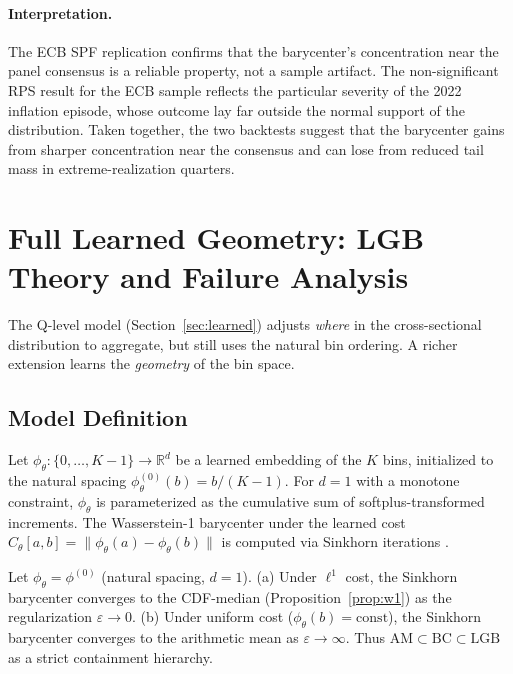 \paragraph{Interpretation.}  The ECB SPF replication confirms that the barycenter's
concentration near the panel consensus is a reliable property, not a sample artifact.
The non-significant RPS result for the ECB sample reflects the particular severity of the 2022
inflation episode, whose outcome lay far outside the normal support of the distribution.
Taken together, the two backtests suggest that the barycenter gains from sharper concentration
near the consensus and can lose from reduced tail mass in extreme-realization quarters.


\section{Full Learned Geometry: LGB Theory and Failure Analysis}
\label{app:lgb}

The Q-level model (Section~\ref{sec:learned}) adjusts \emph{where} in the cross-sectional
distribution to aggregate, but still uses the natural bin ordering.  A richer extension
learns the \emph{geometry} of the bin space.

\subsection*{Model Definition}

Let $\phi_\theta : \{0,\ldots,K-1\} \to \mathbb{R}^d$ be a learned embedding of the $K$ bins,
initialized to the natural spacing $\phi_\theta^{(0)}(b) = b/(K-1)$.  For $d=1$ with a
monotone constraint, $\phi_\theta$ is parameterized as the cumulative sum of softplus-transformed
increments.  The Wasserstein-1 barycenter under the learned cost
$C_\theta[a,b] = \|\phi_\theta(a) - \phi_\theta(b)\|$ is computed via Sinkhorn iterations
\cite{cuturi}.

\begin{theorem}
\label{thm:lgb_recover}
Let $\phi_\theta = \phi^{(0)}$ (natural spacing, $d=1$).
(a) Under $\ell^1$ cost, the Sinkhorn barycenter converges to the CDF-median
    (Proposition~\ref{prop:w1}) as the regularization $\varepsilon \to 0$.
(b) Under uniform cost ($\phi_\theta(b) = \mathrm{const}$), the Sinkhorn barycenter
    converges to the arithmetic mean as $\varepsilon \to \infty$.
Thus $\text{AM} \subset \text{BC} \subset \text{LGB}$ as a strict containment hierarchy.
\end{theorem}

